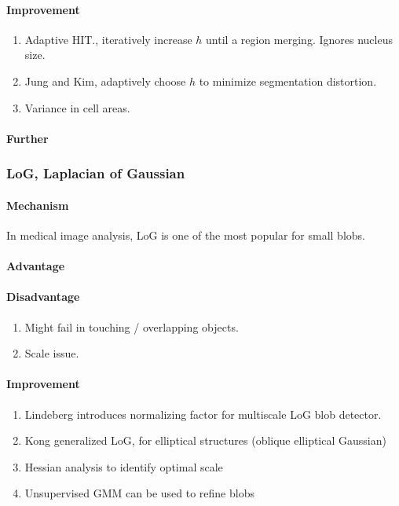 \documentclass[10pt,a4paper]{article}
\begin{document}
\paragraph{Improvement}
\begin{enumerate}
	\item Adaptive HIT., iteratively increase $h$ until a region merging. Ignores nucleus size.
	\item Jung and Kim, adaptively choose $h$ to minimize segmentation distortion.
	\item Variance in cell areas.
\end{enumerate}
\paragraph{Further}

\subsubsection{LoG, Laplacian of Gaussian}
\paragraph{Mechanism}
In medical image analysis, LoG is one of the most popular for small blobs.
\paragraph{Advantage}
\paragraph{Disadvantage}
\begin{enumerate}
	\item Might fail in touching / overlapping objects. 
	\item Scale issue.
\end{enumerate}
\paragraph{Improvement}
\begin{enumerate}
	\item Lindeberg introduces normalizing factor for multiscale LoG blob detector.
	\item Kong generalized LoG, for elliptical structures (oblique elliptical Gaussian)
	\item Hessian analysis to identify optimal scale
	\item Unsupervised GMM can be used to refine blobs
	
\end{enumerate}
\end{document}
